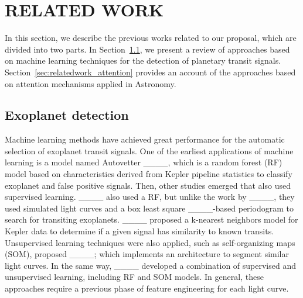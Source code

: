 \section{RELATED WORK}
\label{sec:relatedwork}
In this section, we describe the previous works related to our proposal, which are divided into two parts. In Section~\ref{sec:relatedwork_exoplanet}, we present a review of approaches based on machine learning techniques for the detection of planetary transit signals. Section~\ref{sec:relatedwork_attention} provides an account of the approaches based on attention mechanisms applied in Astronomy.\par

\subsection{Exoplanet detection}
\label{sec:relatedwork_exoplanet}
Machine learning methods have achieved great performance for the automatic selection of exoplanet transit signals. One of the earliest applications of machine learning is a model named Autovetter ____, which is a random forest (RF) model based on characteristics derived from Kepler pipeline statistics to classify exoplanet and false positive signals. Then, other studies emerged that also used supervised learning. ____ also used a RF, but unlike the work by ____, they used simulated light curves and a box least square ____-based periodogram to search for transiting exoplanets. ____ proposed a k-nearest neighbors model for Kepler data to determine if a given signal has similarity to known transits. Unsupervised learning techniques were also applied, such as self-organizing maps (SOM), proposed ____; which implements an architecture to segment similar light curves. In the same way, ____ developed a combination of supervised and unsupervised learning, including RF and SOM models. In general, these approaches require a previous phase of feature engineering for each light curve. \par


